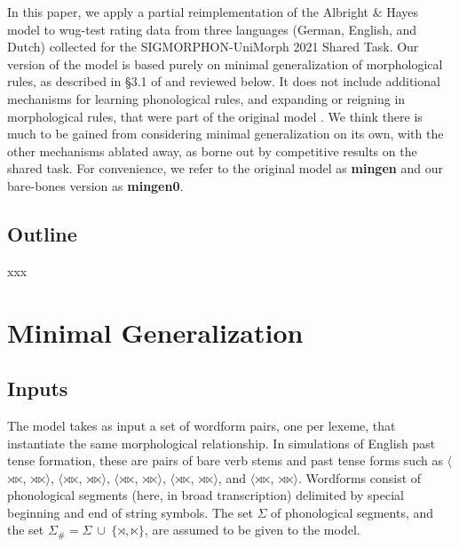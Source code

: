 \documentclass[11pt]{article}
\begin{document}
In this paper, we apply a partial reimplementation of the Albright \& Hayes model to wug-test rating data from three languages (German, English, and Dutch) collected for the SIGMORPHON-UniMorph 2021 Shared Task. Our version of the model is based purely on minimal generalization of morphological rules, as described in \S3.1 of \citet{albright-hayes-2002-modeling} and reviewed below. It does not include additional mechanisms for learning phonological rules, and expanding or reigning in morphological rules, that were part of the original model \citep[see][\S3.3 - \S3.7]{albright-hayes-2002-modeling}. We think there is much to be gained from considering minimal generalization on its own, with the other mechanisms ablated away, as borne out by competitive results on the shared task. For convenience, we refer to the original model as \textbf{mingen} and our bare-bones version as \textbf{mingen0}.

\subsection{Outline}

xxx

\section{Minimal Generalization}
\label{sec:mingen}

\subsection{Inputs}

The model takes as input a set of wordform pairs, one per lexeme, that instantiate the same morphological relationship. In simulations of English past tense formation, these are pairs of bare verb stems and past tense forms such as $\langle$$\rtimes$$\ltimes$, $\rtimes$$\ltimes$$\rangle$, $\langle$$\rtimes$$\ltimes$, $\rtimes$$\ltimes$$\rangle$, $\langle$$\rtimes$$\ltimes$, $\rtimes$$\ltimes$$\rangle$, $\langle$$\rtimes$$\ltimes$, $\rtimes$$\ltimes$$\rangle$, and $\langle$$\rtimes$$\ltimes$, $\rtimes$$\ltimes$$\rangle$. Wordforms consist of phonological segments (here, in broad transcription) delimited by special beginning and end of string symbols. The set $\Sigma$ of phonological segments, and the set $\Sigma_{\#} = \Sigma \ \cup \ \{ \rtimes, \ltimes \}$, are assumed to be given to the model.
\end{document}
